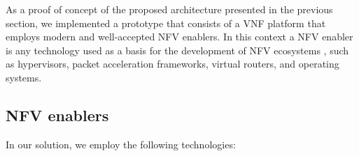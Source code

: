 



As a proof of concept of the proposed architecture presented in the previous section, we implemented a prototype that consists of a VNF platform that employs modern and well-accepted NFV enablers. In this context a NFV enabler is any technology used as a basis for the development of NFV ecosystems \cite{ETSI-2012}, such as hypervisors, packet acceleration frameworks, virtual routers, and operating systems.

\subsection{NFV enablers}

In our solution, we employ the following technologies:

